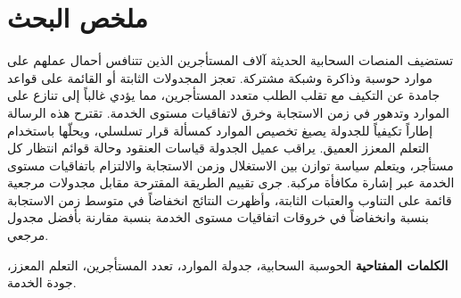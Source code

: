 \chapter*{ملخص البحث}
\thispagestyle{empty}
\begin{Arabic}

تستضيف المنصات السحابية الحديثة آلاف المستأجرين الذين تتنافس أحمال عملهم على
موارد حوسبة وذاكرة وشبكة مشتركة. تعجز المجدولات الثابتة أو القائمة على قواعد
جامدة عن التكيف مع تقلب الطلب متعدد المستأجرين، مما يؤدي غالباً إلى تنازع على
الموارد وتدهور في زمن الاستجابة وخرق لاتفاقيات مستوى الخدمة. تقترح هذه الرسالة
إطاراً تكيفياً للجدولة يصيغ تخصيص الموارد كمسألة قرار تسلسلي، ويحلّها باستخدام
التعلم المعزز العميق. يراقب عميل الجدولة قياسات العنقود وحالة قوائم انتظار كل
مستأجر، ويتعلم سياسة توازن بين الاستغلال وزمن الاستجابة والالتزام باتفاقيات
مستوى الخدمة عبر إشارة مكافأة مركبة. جرى تقييم الطريقة المقترحة مقابل مجدولات
مرجعية قائمة على التناوب والعتبات الثابتة، وأظهرت النتائج انخفاضاً في متوسط
زمن الاستجابة بنسبة  وانخفاضاً في خروقات اتفاقيات مستوى الخدمة بنسبة
 مقارنة بأفضل مجدول مرجعي.

\vspace{10pt}
\noindent\textbf{الكلمات المفتاحية\lat{:}} الحوسبة السحابية، جدولة الموارد، تعدد
المستأجرين، التعلم المعزز، جودة الخدمة.
\end{Arabic}

\tableofcontents
\listoffigures
\listoftables
